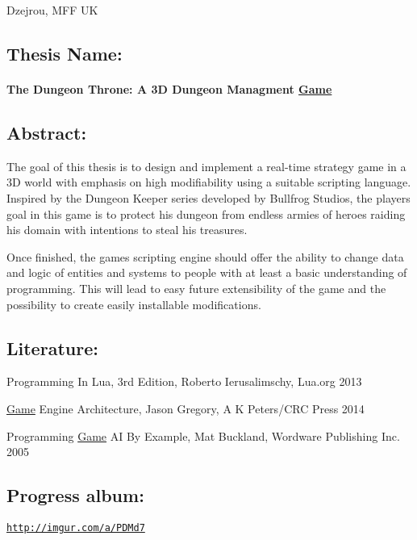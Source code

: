 Dzejrou, M\+FF UK

\subsection*{Thesis Name\+:~\newline
}

\paragraph*{The Dungeon Throne\+: A 3D Dungeon Managment \hyperlink{class_game}{Game}}

\subsection*{Abstract\+:}

The goal of this thesis is to design and implement a real-\/time strategy game in a 3D world with emphasis on high modifiability using a suitable scripting language. Inspired by the Dungeon Keeper series developed by Bullfrog Studios, the player\textquotesingle{}s goal in this game is to protect his dungeon from endless armies of heroes raiding his domain with intentions to steal his treasures.

Once finished, the game\textquotesingle{}s scripting engine should offer the ability to change data and logic of entities and systems to people with at least a basic understanding of programming. This will lead to easy future extensibility of the game and the possibility to create easily installable modifications.

\subsection*{Literature\+:}


\begin{DoxyItemize}
\item Programming In Lua, 3rd Edition, Roberto Ierusalimschy, Lua.\+org 2013
\item \hyperlink{class_game}{Game} Engine Architecture, Jason Gregory, A K Peters/\+C\+RC Press 2014
\item Programming \hyperlink{class_game}{Game} AI By Example, Mat Buckland, Wordware Publishing Inc. 2005
\end{DoxyItemize}

\subsection*{Progress album\+:}

\href{http://imgur.com/a/PDMd7}{\tt http\+://imgur.\+com/a/\+P\+D\+Md7} 